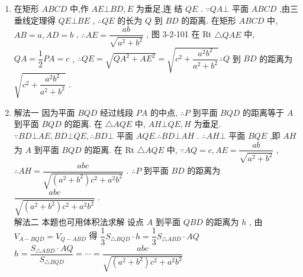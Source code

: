 \begin{enumerate}
\begin{jieda}
    \begin{enumerate}
        \item 在矩形 $ {ABCD} $ 中,作 $ {AE}\bot {BD},E $ 为垂足,连
结 $ {QE} $ .
$ \because {QA} \bot $ 平面 $ {ABCD} $ ,由三垂线定理得 $ {QE} \bot  {BE} $ ,
$ \therefore {QE} $ 的长为 $ Q $ 到 $ {BD} $ 的距离.
在矩形 $ {ABCD} $ 中, $ {AB} = a,{AD} = b $ ,
$ \therefore {AE} = \dfrac{ab}{\sqrt{{a}^{2} + {b}^{2}}} $ , 图 3-2-101
在 Rt $ \bigtriangleup {QAE} $ 中, $ {QA} = \dfrac{1}{2}{PA} = c $ ,
$ \therefore {QE} = \sqrt{Q{A}^{2} + A{E}^{2}} = \sqrt{{c}^{2} + \dfrac{{a}^{2}{b}^{2}}{{a}^{2} + {b}^{2}}}\therefore Q $ 到 $ {BD} $ 的距离为 $ \sqrt{{c}^{2} + \dfrac{{a}^{2}{b}^{2}}{{a}^{2} + {b}^{2}}} $ .
    \item 解法一 因为平面 $ {BQD} $ 经过线段 $ {PA} $ 的中点,
$ \therefore P $ 到平面 $ {BQD} $ 的距离等于 $ A $ 到平面 $ {BQD} $ 的距离.
在 $ \bigtriangleup {AQE} $ 中, $ {AH}\bot {QE},H $ 为垂足.
$ \because {BD} \bot  {AE},{BD} \bot  {QE},\therefore {BD} \bot $ 平面 $ {AQE}.\therefore {BD} \bot  {AH} $ .
$ \therefore {AH} \bot $ 平面 $ {BQE} $ ,即 $ {AH} $ 为 $ A $ 到平面 $ {BQD} $ 的距离.
在 Rt $ \bigtriangleup {AQE} $ 中, $ \because {AQ} = c,{AE} = \dfrac{ab}{\sqrt{{a}^{2} + {b}^{2}}} $ ,
$ \therefore {AH} = \dfrac{abc}{\sqrt{\left( {{a}^{2} + {b}^{2}}\right) {c}^{2} + {a}^{2}{b}^{2}}} $ .
$ \therefore P $ 到平面 $ {BD} $ 的距离为 $ \dfrac{abc}{\sqrt{\left( {{a}^{2} + {b}^{2}}\right) {c}^{2} + {a}^{2}{b}^{2}}} $ .\\
解法二 本题也可用体积法求解
设点 $ A $ 到平面 $ {QBD} $ 的距离为 $ h $ ,
由 $ {V}_{A - {BQD}} = {V}_{Q - {ABD}} $ 得
$ \dfrac{1}{3}{S}_{\bigtriangleup {BQD}} \cdot  h = \dfrac{1}{3}{S}_{\bigtriangleup {ABD}} \cdot  {AQ} $
$ h = \dfrac{{S}_{\bigtriangleup {ABD}} \cdot  {AQ}}{{S}_{\bigtriangleup {BQD}}} = \cdots  = \dfrac{abc}{\sqrt{\left( {{a}^{2} + {b}^{2}}\right) {c}^{2} + {a}^{2}{b}^{2}}} $
    \end{enumerate}
\end{jieda}



\end{enumerate}

